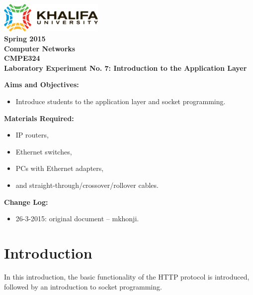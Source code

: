 \documentclass[pdftex,12pt,a4paper]{article}
\begin{document}
    \begin{titlepage}
        \begin{center}
            \includegraphics[width=5cm]{figures/kulogo}\\[1cm]
            {\Large \bfseries
                Spring 2015\\
                Computer Networks\\
                CMPE324\\[1cm]
            }
            {\large \bfseries
                \noindent Laboratory Experiment No. 7: Introduction to the Application Layer\\[1cm]
            }
        \end{center}

        \noindent \textbf{Aims and Objectives:}
            \begin{itemize}[leftmargin=4cm]
                \item Introduce students to the application layer and socket
                programming.
            \end{itemize}
            \vspace{0.5cm}

        \noindent \textbf{Materials Required:}
            \begin{itemize}[leftmargin=4cm]
                \item IP routers,
                \item Ethernet switches,
                \item PCs with Ethernet adapters,
                \item and straight-through/crossover/rollover cables.
            \end{itemize}
            \vspace{0.5cm}

        \noindent \textbf{Change Log:}
            \begin{itemize}[leftmargin=4cm]
                \item 26-3-2015: original document -- mkhonji.
            \end{itemize}
    \end{titlepage}
    \newpage

    \section{Introduction}
        In this introduction, the basic functionality of the HTTP protocol is
        introduced, followed by an introduction to socket programming.
\end{document}
